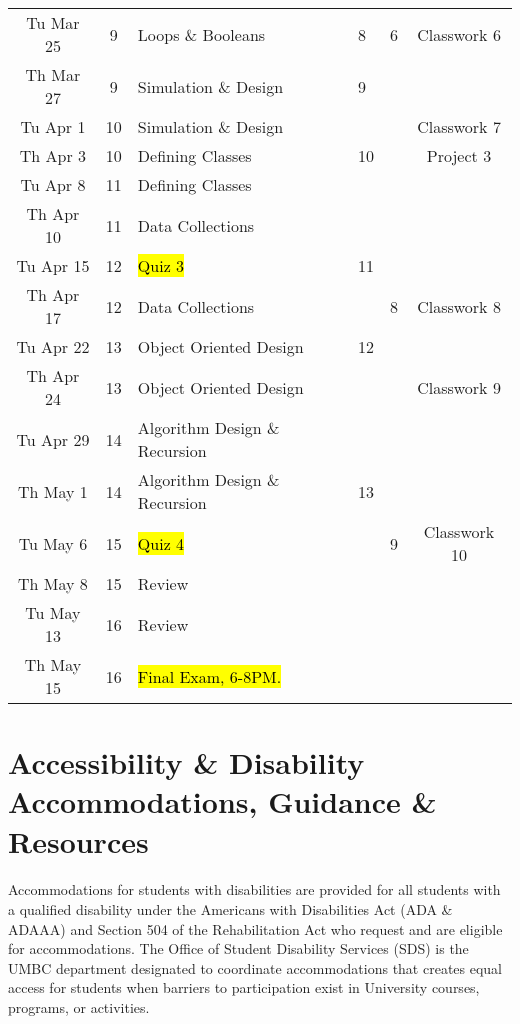 \documentclass[letter,10pt]{article}
\begin{document}
\begin{tabular}{c c l l l c}
Tu Mar 25  & 9  & Loops \& Booleans & 8 & 6 & Classwork 6 \\
Th Mar 27  & 9 & Simulation \& Design & 9 & & \\ \hline
Tu Apr 1     & 10 & Simulation \& Design & & & Classwork 7 \\ 
Th Apr 3     & 10 & Defining Classes & 10 & & Project 3\\
Tu Apr 8     & 11 & Defining Classes & & & \\
Th Apr 10   & 11 & Data Collections & & & \\
Tu Apr 15   & 12 & \hl{Quiz 3}  & 11 & &  \\
Th Apr 17   & 12 & Data Collections & & 8 & Classwork 8\\
Tu Apr 22   & 13 & Object Oriented Design & 12 & & \\
Th Apr 24   & 13 & Object Oriented Design & & & Classwork 9 \\
Tu Apr 29   & 14 & Algorithm Design \& Recursion & & & \\ \hline
Th May 1    & 14 & Algorithm Design \& Recursion & 13 & & \\
Tu May 6    & 15 & \hl{Quiz 4} & & 9 & Classwork 10 \\
Th May 8    & 15 & Review & & & \\
Tu May 13  & 16 & Review & & & \\
Th May 15  & 16 & \hl{Final Exam, 6-8PM.} & & & \\
\end{tabular}

\section*{Accessibility \& Disability Accommodations, Guidance \& Resources}
\paragraph{}Accommodations for students with disabilities are provided for all students with a qualified disability under the Americans with Disabilities Act (ADA \& ADAAA) and Section 504 of the Rehabilitation Act who request and are eligible for accommodations. The Office of Student Disability Services (SDS) is the UMBC department designated to coordinate accommodations that creates equal access for students when barriers to participation exist in University courses, programs, or activities.
\end{document}
